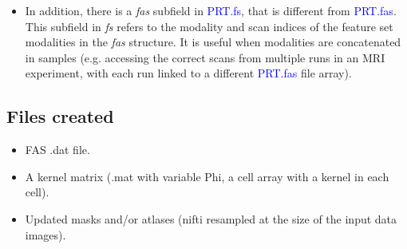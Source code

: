 \begin{itemize}
\item In addition, there is a \textit{fas} subfield in \textcolor{blue}{PRT.fs}, that is different from \textcolor{blue}{PRT.fas}. This subfield in \textit{fs} refers to the modality and scan indices of the feature set modalities in the \textit{fas} structure. It is useful when modalities are concatenated in samples (e.g. accessing the correct scans from multiple runs in an MRI experiment, with each run linked to a different \textcolor{blue}{PRT.fas} file array).

\end{itemize} 









\subsection{Files created}

\begin{itemize}
\item FAS .dat file.
\item A kernel matrix (.mat with variable Phi, a cell array with a kernel in each cell).
\item Updated masks and/or atlases (nifti resampled at the size of the input data images).
\end{itemize}


